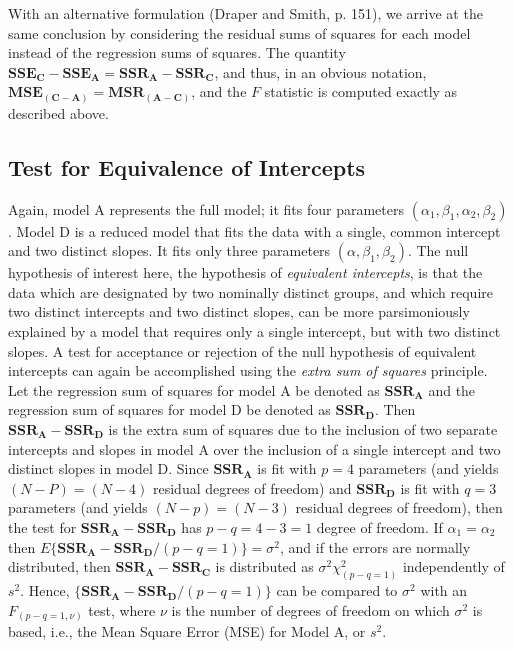 \documentclass[11pt, oneside]{article}   	%
\begin{document}
With an alternative formulation (Draper and Smith, p. 151), we arrive at the same conclusion by considering the residual sums of squares for each model instead of the regression sums of squares.  The quantity $ \mathbf{ SSE_{C}} - \mathbf{SSE_{A} }  =   \mathbf{SSR_{A}} -  \mathbf{SSR_{C}}  $, and thus, in an obvious notation, $ \mathbf{ MSE_{(C-A)}}   =  \mathbf{MSR_{(A-C)}} $, and the $  F  $ statistic is computed exactly as described above.
\bigskip
   
\subsection{Test for Equivalence of Intercepts}
Again, model A represents the full model; it fits four parameters $  (\alpha_{1}, \beta_{1}, \alpha_{2}, \beta_{2}) $.  Model D is a reduced model that fits the data with a single, common intercept and two distinct slopes.  It fits only three parameters $  (\alpha, \beta_{1}, \beta_{2}) $. The null hypothesis of interest here, the hypothesis of \emph{equivalent intercepts}, is that the data which are designated by two nominally distinct groups, and which require two distinct intercepts and two distinct slopes, can be more parsimoniously explained by a model that requires only a single intercept, but with two distinct slopes.  A test for acceptance or rejection of the null hypothesis of equivalent intercepts can again be accomplished using the \emph{extra sum of squares} principle. Let the regression sum of squares for model A be denoted as $ \mathbf{SSR_{A}} $ and the regression sum of squares for model D be denoted as $ \mathbf{SSR_{D}} $. Then $ \mathbf{SSR_{A}} -  \mathbf{SSR_{D}} $ is the extra sum of squares due to the inclusion of two separate intercepts and slopes in model A over the inclusion of a single intercept and two distinct slopes in model D. Since  $ \mathbf{SSR_{A}} $  is fit with $ p = 4 $ parameters (and yields $ (N - P) = (N - 4) $ residual degrees of freedom) and $  \mathbf{SSR_{D}} $ is fit with $ q = 3 $ parameters (and yields $ (N - p) = (N - 3) $ residual degrees of freedom), then the test for $ \mathbf{SSR_{A}} -  \mathbf{SSR_{D}} $ has $  p - q = 4 - 3 = 1  $ degree of freedom.  If $ \alpha_{1} = \alpha_ {2} $ then $ E\{  \mathbf{SSR_{A}} -  \mathbf{SSR_{D}}   / (p - q = 1) \} = \sigma^{2} $, and if the errors are normally distributed, then $ \mathbf{SSR_{A}} -  \mathbf{SSR_{C}} $ is distributed as  $ \sigma^{2} \chi^{2}_{(p-q=1)}  $ independently of $ s^{2}  $.  Hence, $ \{  \mathbf{SSR_{A}} -  \mathbf{SSR_{D}}   / (p - q = 1) \} $ can be compared to $ \sigma^{2} $ with an $ F_(p-q =1, \nu) $ test, where $ \nu $ is the number of degrees of freedom on which $ \sigma^{2} $ is based, i.e., the Mean Square Error (MSE) for Model A, or $  s^2 $.   
\end{document}

